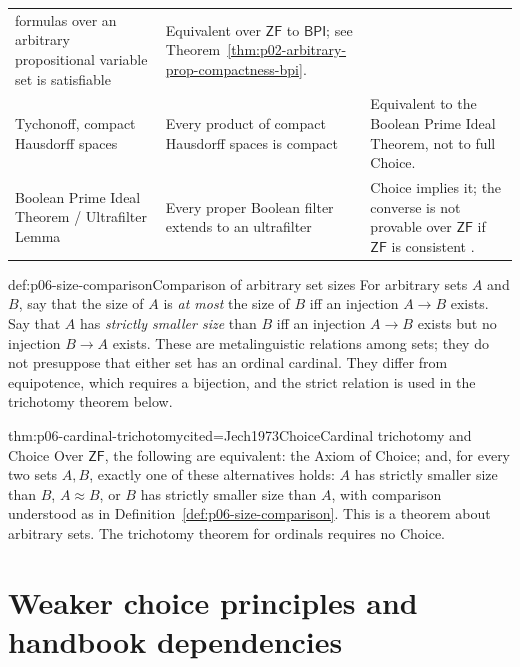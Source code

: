 \begin{longtable}{@{}p{}p{}p{}@{}}
formulas over an arbitrary propositional variable set is satisfiable &
Equivalent over \(\mathsf{ZF}\) to \(\mathsf{BPI}\); see
Theorem~\ref{thm:p02-arbitrary-prop-compactness-bpi}. \\
Tychonoff, compact Hausdorff spaces & Every product of compact Hausdorff spaces
is compact & Equivalent to the Boolean Prime Ideal Theorem, not to full
Choice. \\
Boolean Prime Ideal Theorem / Ultrafilter Lemma & Every proper Boolean filter
extends to an ultrafilter & Choice implies it; the converse is not provable
over \(\mathsf{ZF}\) if \(\mathsf{ZF}\) is consistent
\cite{HalpernLevy1971,HowardRubin1998}. \\
\bottomrule
\end{longtable}
\endgroup

\begin{hbdefinition}{def:p06-size-comparison}{Comparison of arbitrary set sizes}
For arbitrary sets \(A\) and \(B\), say that the size of \(A\) is
\emph{at most} the size of \(B\) iff an injection \(A\to B\) exists.  Say
that \(A\) has \emph{strictly smaller size} than \(B\) iff an injection
\(A\to B\) exists but no injection \(B\to A\) exists.  These are
metalinguistic relations among sets; they do not presuppose that either set
has an ordinal cardinal.  They differ from equipotence, which requires a
bijection, and the strict relation is used in the trichotomy theorem below.
\end{hbdefinition}

\begin{hbtheorem}{thm:p06-cardinal-trichotomy}{cited=Jech1973Choice}{Cardinal trichotomy and Choice}
Over \(\mathsf{ZF}\), the following are equivalent: the Axiom of Choice; and,
for every two sets \(A,B\), exactly one of these alternatives holds:
\(A\) has strictly smaller size than \(B\), \(A\approx B\), or \(B\) has
strictly smaller size than \(A\), with comparison understood as in
Definition~\ref{def:p06-size-comparison}.  This is a theorem about
arbitrary sets.  The trichotomy theorem for ordinals requires no Choice.
\end{hbtheorem}

\section[Weaker choice principles]{Weaker choice principles and handbook dependencies}


